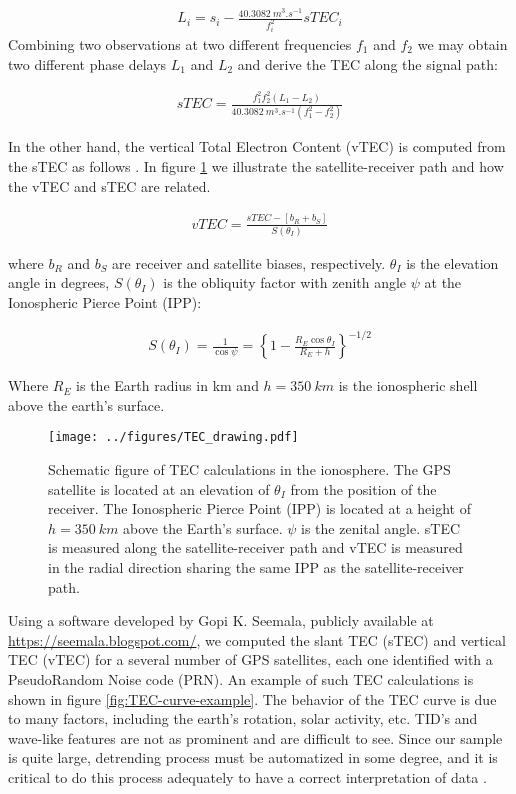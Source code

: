   \begin{align}
    L_i = s_i - \frac{\SI{40.3082}{m^3.s^{-1}}}{f_i^2}sTEC_i
  \end{align}
  Combining two observations at two different frequencies $f_1$ and $f_2$ we may obtain two different phase delays $L_1$ and $L_2$ and derive the TEC along the signal path:

  \begin{align}
    sTEC = \frac{f_1^2f_2^2\left(L_1-L_2\right)}{\SI{40.3082}{m^3.s^{-1}}\left(f_1^2-f_2^2\right)}
  \end{align}

  In the other hand, the vertical Total Electron Content (vTEC) is computed from the sTEC as follows \citep{Kumar:2012}. In figure \ref{fig:TEC-sketch} we illustrate the satellite-receiver path and how the vTEC and sTEC are related.
  
  \begin{align}
    vTEC = \frac{sTEC-\left[b_R+b_S\right]}{S(\theta_I)}
  \end{align}

  where $b_R$ and $b_S$ are receiver and satellite biases, respectively. $\theta_I$ is the elevation angle in degrees, $S(\theta_I)$ is the obliquity factor with zenith angle $\psi$ at the Ionospheric Pierce Point (IPP):

  \begin{align}
    S(\theta_I) = \frac{1}{\cos\psi} = \left\lbrace 1-\frac{R_E\cos\theta_I}{R_E+h}\right\rbrace^{-1/2}
  \end{align}

  Where $R_E$ is the Earth radius in km and $h=\SI{350}{km}$ is the ionospheric shell above the earth's surface.

\begin{figure}
    \centering
    \texttt{[image: ../figures/TEC\_drawing.pdf]}
    \caption{Schematic figure of TEC calculations in the ionosphere. The GPS satellite is located at an elevation of $\theta_I$ from the position of the receiver. The Ionospheric Pierce Point (IPP) is located at a height of $h=\SI{350}{km}$ above the Earth's surface. $\psi$ is the zenital angle. sTEC is measured along the satellite-receiver path and vTEC is measured in the radial direction sharing the same IPP as the satellite-receiver path.}
    \label{fig:TEC-sketch}
\end{figure}

 Using a software developed by Gopi K. Seemala, publicly available at \url{https://seemala.blogspot.com/}, we computed the slant TEC (sTEC) and vertical TEC (vTEC) for a several number of GPS satellites, each one identified with a PseudoRandom Noise code (PRN). An example of such TEC calculations is shown in figure \ref{fig:TEC-curve-example}. The behavior of the TEC curve is due to many factors, including the earth's rotation, solar activity, etc. TID's and wave-like features are not as prominent and are difficult to see. Since our sample is quite large, detrending process must be automatized in some degree, and it is critical to do this process adequately to have a correct interpretation of data \citep{Boris:2020}.
 
